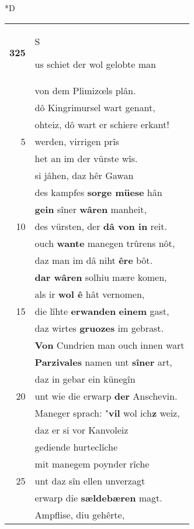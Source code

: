 \documentclass[8pt,a4paper,notitlepage]{article}
\begin{document}
\begin{table}[ht]
\begin{minipage}[t]{0.5\linewidth}
\small
\begin{center}*D
\end{center}
\begin{tabular}{rl}
\textbf{325} & \begin{large}S\end{large}us schiet der wol gelobte man\\ 
 & von dem Plimizœls plân.\\ 
 & dô Kingrimursel wart genant,\\ 
 & ohteiz, dô wart er schiere erkant!\\ 
5 & werden, virrigen prîs\\ 
 & het an im der vürste wîs.\\ 
 & si jâhen, daz hêr Gawan\\ 
 & des kampfes \textbf{sorge müese} hân\\ 
 & \textbf{gein} sîner \textbf{wâren} manheit,\\ 
10 & des vürsten, der \textbf{dâ von in} reit.\\ 
 & ouch \textbf{wante} manegen trûrens nôt,\\ 
 & daz man im dâ niht \textbf{êre} bôt.\\ 
 & \textbf{dar wâren} solhiu mære komen,\\ 
 & als ir \textbf{wol ê} hât vernomen,\\ 
15 & die lîhte \textbf{erwanden} \textbf{einem} gast,\\ 
 & daz wirtes \textbf{gruozes} im gebrast.\\ 
 & \textbf{Von} Cundrien man ouch innen wart\\ 
 & \textbf{Parzivales} namen unt \textbf{sîner} art,\\ 
 & daz in gebar ein künegîn\\ 
20 & unt wie die erwarp \textbf{der} Anschevin.\\ 
 & Maneger sprach: "\textbf{vil} wol ich\textbf{z} weiz,\\ 
 & daz er si vor Kanvoleiz\\ 
 & gediende hurteclîche\\ 
 & mit manegem poynder rîche\\ 
25 & unt daz sîn ellen unverzagt\\ 
 & erwarp die \textbf{sældebæren} magt.\\ 
 & Ampflise, diu gehêrte,\\ 

\end{tabular}
\end{minipage}
\end{table}
\end{document}
